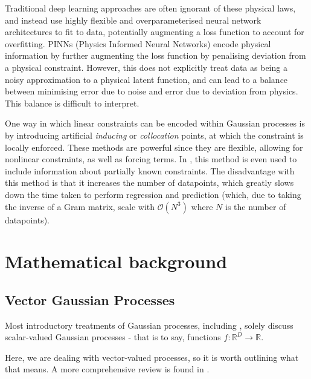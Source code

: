 \documentclass[12pt,a4paper,twoside]{report}
\theoremstyle{definition}
\begin{document}
Traditional deep learning approaches are often ignorant of these physical laws, and instead use highly flexible and overparameterised neural network architectures to fit to data, potentially augmenting a loss function to account for overfitting. 
PINNs (Physics Informed Neural Networks) \cite{Raissi} encode physical information by further augmenting the loss function by penalising deviation from a physical constraint. However, this does not explicitly treat data as being a noisy approximation to a physical latent function, and can lead to a balance between minimising error due to noise and error due to deviation from physics. This balance is difficult to interpret.

One way in which linear constraints can be encoded within Gaussian processes is by introducing artificial \emph{inducing} or \emph{collocation} points, at which the constraint is locally enforced. These methods are powerful since they are flexible, allowing for nonlinear constraints, as well as forcing terms. In \cite{long}, this method is even used to include information about partially known constraints. The disadvantage with this method is that it increases the number of datapoints, which greatly slows down the time taken to perform regression and prediction (which, due to taking the inverse of a Gram matrix, scale with $\mathcal O(N^3)$ where $N$ is the number of datapoints).

\chapter{Mathematical background}
\section{Vector Gaussian Processes}
\raggedright Most introductory treatments of Gaussian processes, including \cite{rasmussen}, solely discuss scalar-valued Gaussian processes - that is to say, functions $f:\mathbb{R}^D\to\mathbb{R}$.

Here, we are dealing with vector-valued processes, so it is worth outlining what that means. A more comprehensive review is found in \cite{alvarez}.
\end{document}
